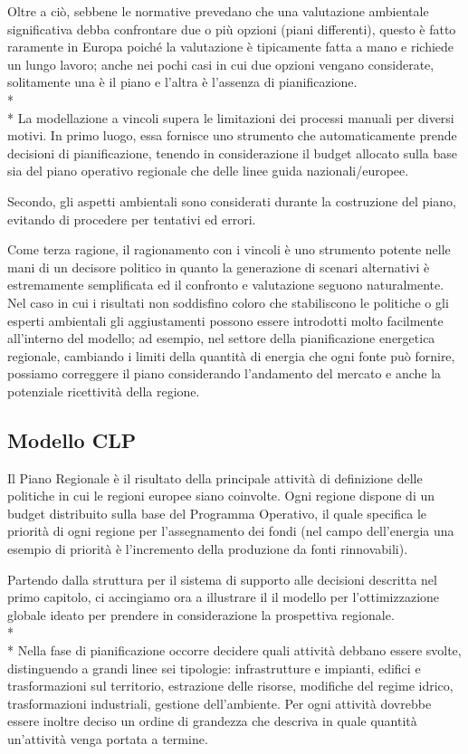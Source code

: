 Oltre a ciò, sebbene le normative prevedano che una valutazione ambientale significativa debba confrontare due o più opzioni (piani differenti), questo è fatto raramente in Europa poiché la valutazione è tipicamente fatta a mano e richiede un lungo lavoro; anche nei pochi casi in cui due opzioni vengano considerate, solitamente una è il piano e l'altra è l'assenza di pianificazione.\\*\\*
La modellazione a vincoli supera le limitazioni dei processi manuali per diversi motivi. In primo luogo, essa fornisce uno strumento che automaticamente prende decisioni di pianificazione, tenendo in considerazione il budget allocato sulla base sia del piano operativo regionale che delle linee guida nazionali/europee.

Secondo, gli aspetti ambientali sono considerati durante la costruzione del piano, evitando di procedere per tentativi ed errori.

Come terza ragione, il ragionamento con i vincoli è uno strumento potente nelle mani di un decisore politico in quanto la generazione di scenari alternativi è estremamente semplificata ed il confronto e valutazione seguono naturalmente. Nel caso in cui i risultati non soddisfino coloro che stabiliscono le politiche o gli esperti ambientali gli aggiustamenti possono essere introdotti molto facilmente all'interno del modello; ad esempio, nel settore della pianificazione energetica regionale, cambiando i limiti della quantità di energia che ogni fonte può fornire, possiamo correggere il piano considerando l'andamento del mercato e anche la potenziale ricettività della regione.

\subsection{Modello CLP}
Il Piano Regionale è il risultato della principale attività di definizione delle politiche in cui le regioni europee siano coinvolte. Ogni regione dispone di un budget distribuito sulla base del Programma Operativo, il quale specifica le priorità di ogni regione per l'assegnamento dei fondi (nel campo dell'energia una esempio di priorità è l'incremento della produzione da fonti rinnovabili).

Partendo dalla struttura per il sistema di supporto alle decisioni descritta nel primo capitolo, ci accingiamo ora a illustrare il il modello per l'ottimizzazione globale ideato per prendere in considerazione la prospettiva regionale. 
\\* \\*
Nella fase di pianificazione occorre decidere quali attività debbano essere svolte, distinguendo a grandi linee sei tipologie: infrastrutture e impianti, edifici e trasformazioni sul territorio, estrazione delle risorse, modifiche del regime idrico, trasformazioni industriali, gestione dell'ambiente. Per ogni attività dovrebbe essere inoltre deciso un ordine di grandezza che descriva in quale quantità un'attività venga portata a termine.

